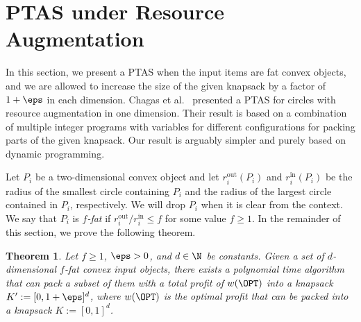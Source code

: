 \documentclass[10pt,a4paper]{article}
\newtheorem{theorem}{Theorem}[section]
\theoremstyle{plain}
\theoremstyle{plain}
\theoremstyle{plain}
\theoremstyle{definition}
\newcommand{\arir}[1]{}
\newcommand{\ari}[1]{#1}
\newcommand{\ag}[1]{#1}
\begin{document}
\section{\textsf{PTAS} under Resource Augmentation}
\label{sec:ptas-ra}
In this section, we present a \textsf{PTAS} when the input items are fat convex objects, and we are allowed to increase the size of the given knapsack by a factor of $1+\eps$ in each dimension. Chagas et al.~\cite{MiyazawaWAOA} presented a \textsf{PTAS} for circles with resource augmentation in one dimension. Their result is based on a combination of multiple integer programs with variables for different configurations for packing parts of the given knapsack.
Our result is arguably simpler and purely based on dynamic programming.


Let $P_i$ be a two-dimensional convex object and let $r_{i}^{\mathrm{out}}(P_i)$ and $r_{i}^{\mathrm{in}}(P_i)$ be
the radius of the smallest circle containing $P_{i}$ and the radius
of the largest circle contained in $P_i$, respectively. 
We will drop $P_i$ when it is clear from the context. 
We say that $P_i$ is $f$\emph{-fat} if  $r_{i}^{\mathrm{out}}/r_{i}^{\mathrm{in}}\le f$
for some value $f \ge 1$. In the remainder of this section, we prove the following theorem.

\begin{theorem}
	\label{thm:fat-ra}
	Let \ari{$f\ge 1$}, $\eps>0$, and $d\in \N$ be constants. Given a set of $d$-dimensional $f$-fat convex input objects, there exists a polynomial time algorithm that can pack a subset of them with a total profit of \ag{$w(\OPT)$} into a knapsack $K':=[0, 1+\eps]^d$, where \ag{$w(\OPT)$} is the optimal profit that can be packed into a knapsack $K:=[0, 1]^d$.
\end{theorem}
\arir{OPT is value or set}
\end{document}
